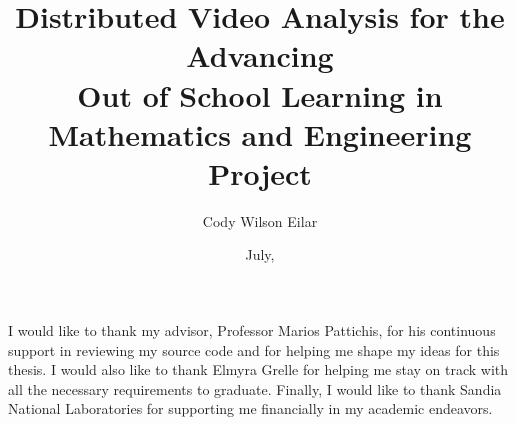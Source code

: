 \documentclass[botnum, fleqn]{unmeethesis}
\begin{document}
  \frontmatter




  \title{Distributed Video Analysis for the  Advancing  \\
  Out of School Learning in Mathematics and Engineering Project}

  \author{Cody Wilson Eilar}





  \date{July, \thisyear}

  \maketitle



  \begin{acknowledgments}
    \vspace{1.1in}
    I would like to thank my advisor, Professor Marios Pattichis, for his
    continuous support in reviewing my source code and for helping me shape my
    ideas for this thesis. I would also like to thank Elmyra Grelle for helping
    me stay on track with all the necessary requirements to graduate. Finally, I
    would like to thank Sandia National Laboratories for supporting me
    financially in my academic endeavors.
  \end{acknowledgments}

  \maketitleabstract %
\end{document}
